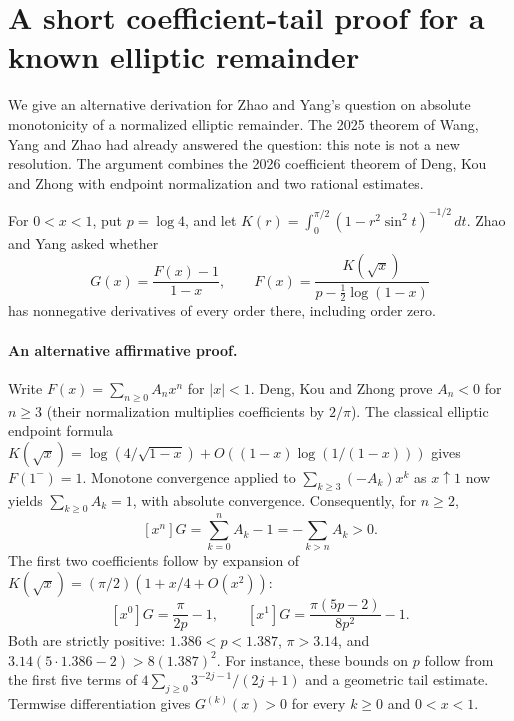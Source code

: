 \documentclass[11pt,a4paper]{article}
\numberwithin{equation}{section}
\theoremstyle{definition}
\theoremstyle{remark}
\newenvironment{sectionabstract}{\par\smallskip\begingroup\small\noindent}{\par\endgroup\medskip}
\begin{document}
\par\endgroup

\begingroup

\section{\texorpdfstring{A short coefficient-tail proof for a known elliptic remainder}{A short coefficient-tail proof for a known elliptic remainder}}\label{section:r30taisho}
\par\medskip

\begin{sectionabstract}
We give an alternative derivation for Zhao and Yang's question on absolute monotonicity of a normalized elliptic remainder. The 2025 theorem of Wang, Yang and Zhao had already answered the question: this note is not a new resolution. The argument combines the 2026 coefficient theorem of Deng, Kou and Zhong with endpoint normalization and two rational estimates.
\end{sectionabstract}
For $0<x<1$, put $p=\log 4$, and let $K(r)=\int_0^{\pi/2}(1-r^2\sin^2t)^{-1/2}\,dt$. Zhao and Yang \cite[Remark 8(iii)]{r30taisho:zy} asked whether
\[
    G(x)=\frac{F(x)-1}{1-x},\qquad
    F(x)=\frac{K(\sqrt{x})}{p-\frac12\log(1-x)}
\]
has nonnegative derivatives of every order there, including order zero.

\paragraph{An alternative affirmative proof.}
Write $F(x)=\sum_{n\ge0}A_nx^n$ for $|x|<1$. Deng, Kou and Zhong \cite[Theorem 1.1]{r30taisho:dkz} prove $A_n<0$ for $n\ge3$ (their normalization multiplies coefficients by $2/\pi$). The classical elliptic endpoint formula $K(\sqrt{x})=\log(4/\sqrt{1-x})+O((1-x)\log(1/(1-x)))$ gives $F(1^-)=1$. Monotone convergence applied to $\sum_{k\ge3}(-A_k)x^k$ as $x\uparrow1$ now yields $\sum_{k\ge0}A_k=1$, with absolute convergence. Consequently, for $n\ge2$,
\[
    [x^n]G=\sum_{k=0}^n A_k-1=-\sum_{k>n}A_k>0.
\]
The first two coefficients follow by expansion of $K(\sqrt x)=(\pi/2)(1+x/4+O(x^2))$:
\[
  [x^0]G=\frac{\pi}{2p}-1,\qquad
  [x^1]G=\frac{\pi(5p-2)}{8p^2}-1.
\]
Both are strictly positive: $1.386<p<1.387$, $\pi>3.14$, and $3.14(5\cdot1.386-2)>8(1.387)^2$. For instance, these bounds on $p$ follow from the first five terms of $4\sum_{j\ge0} 3^{-2j-1}/(2j+1)$ and a geometric tail estimate. Termwise differentiation gives $G^{(k)}(x)>0$ for every $k\ge0$ and $0<x<1$.
\end{document}
